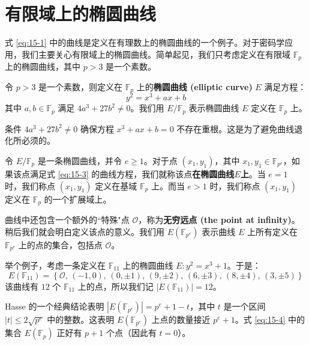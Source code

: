 \section{有限域上的椭圆曲线}\label{sec:15-2}

式 \ref{eq:15-1} 中的曲线是定义在有理数上的椭圆曲线的一个例子。对于密码学应用，我们主要关心有限域上的椭圆曲线。简单起见，我们只考虑定义在有限域 $\mathbb{F}_p$ 上的椭圆曲线，其中 $p>3$ 是一个素数。

\begin{definition}\label{def:15-1}
令 $p>3$ 是一个素数，则定义在 $\mathbb{F}_p$ 上的\textbf{椭圆曲线 (elliptic curve)} $E$ 满足方程：
\begin{equation}\label{eq:15-3}
y^2=x^3+ax+b
\end{equation}
其中 $a,b\in\mathbb{F}_p$ 满足 $4a^3+27b^2\neq0$。我们用 $E/\mathbb{F}_p$ 表示椭圆曲线 $E$ 定义在 $\mathbb{F}_p$ 上。
\end{definition}

条件 $4a^3+27b^2\neq0$ 确保方程 $x^3+ax+b=0$ 不存在重根。这是为了避免曲线退化所必须的。

\begin{snote}[椭圆曲线上的点集。]
令 $E/\mathbb{F}_p$ 是一条椭圆曲线，并令 $e\geq 1$。对于点 $(x_1,y_1)$，其中 $x_1,y_1 \in \mathbb{F}_{p^e}$，如果该点满足式 \ref{eq:15-3} 的曲线方程，我们就称该点\textbf{在椭圆曲线$E$上}。当 $e=1$ 时，我们称点 $(x_1,y_1)$ 定义在基域 $\mathbb{F}_p$ 上。而当 $e>1$ 时，我们称点 $(x_1,y_1)$ 定义在 $\mathbb{F}_p$ 的一个扩展域上。

曲线中还包含一个额外的``特殊"点 $\mathcal{O}$，称为\textbf{无穷远点 (the point at infinity)}。稍后我们就会明白定义该点的意义。我们用 $E(\mathbb{F}_{p^e})$ 表示曲线 $E$ 上所有定义在 $\mathbb{F}_{p^e}$ 上的点的集合，包括点 $\mathcal{O}$。

举个例子，考虑一条定义在 $\mathbb{F}_{11}$ 上的椭圆曲线 $E: y^2=x^3+1$。于是：
\begin{equation}\label{eq:15-4}
E(\mathbb{F}_{11})=\left\{\mathcal{O},\,(-1,0),\,(0,\pm1),\,(9,\pm2),\,(6,\pm3),\,(8,\pm4),\,(3,\pm5)\right\}
\end{equation}
该曲线有 $12$ 个 $\mathbb{F}_{11}$ 上的点，所以我们记 $|E(\mathbb{F}_{11})|=12$。

Hasse 的一个经典结论表明 $|E(\mathbb{F}_{p^e})|=p^e+1-t$，其中 $t$ 是一个区间 $|t|\leq 2\sqrt{p^e}$ 中的整数。这表明 $E(\mathbb{F}_{p^e})$ 上点的数量接近 $p^e+1$。式 \ref{eq:15-4} 中的集合 $E(\mathbb{F}_p)$ 正好有 $p+1$ 个点（因此有 $t=0$）。
\end{snote}

